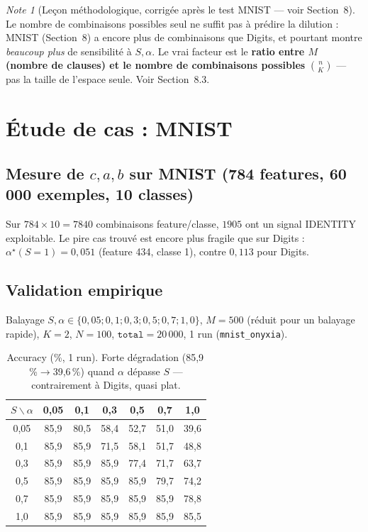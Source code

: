 \documentclass[12pt,a4paper]{article}
\theoremstyle{remark}
\newtheorem{note}{Note}[section]
\begin{document}
\begin{note}[Leçon méthodologique, corrigée après le test MNIST --- voir Section~8]
Le nombre de combinaisons possibles seul ne suffit pas à prédire la dilution :
MNIST (Section~8) a encore plus de combinaisons que Digits, et pourtant montre
\emph{beaucoup plus} de sensibilité à $S,\alpha$. Le vrai facteur est le
\textbf{ratio entre $M$ (nombre de clauses) et le nombre de combinaisons
possibles} $\binom{n}{K}$ --- pas la taille de l'espace seule. Voir Section~8.3.
\end{note}

\section{Étude de cas : MNIST}

\subsection{Mesure de $c,a,b$ sur MNIST (784 features, 60\,000 exemples, 10 classes)}

Sur $784\times10=7840$ combinaisons feature/classe, $1905$ ont un signal
IDENTITY exploitable. Le pire cas trouvé est encore plus fragile que sur
Digits : $\alpha^\star(S{=}1)=0{,}051$ (feature 434, classe 1), contre $0{,}113$
pour Digits.

\subsection{Validation empirique}

Balayage $S,\alpha\in\{0{,}05;0{,}1;0{,}3;0{,}5;0{,}7;1{,}0\}$, $M=500$
(réduit pour un balayage rapide), $K=2$, $N=100$, $\mathtt{total}=20\,000$,
1 run (\texttt{mnist\_onyxia}).

\begin{table}[h]
\centering
\renewcommand{\arraystretch}{1.2}
\begin{tabular}{ccccccc}
\toprule
$S \backslash \alpha$ & 0,05 & 0,1 & 0,3 & 0,5 & 0,7 & 1,0 \\
\midrule
0,05 & 85,9 & 80,5 & 58,4 & 52,7 & 51,0 & 39,6 \\
0,1  & 85,9 & 85,9 & 71,5 & 58,1 & 51,7 & 48,8 \\
0,3  & 85,9 & 85,9 & 85,9 & 77,4 & 71,7 & 63,7 \\
0,5  & 85,9 & 85,9 & 85,9 & 85,9 & 79,7 & 74,2 \\
0,7  & 85,9 & 85,9 & 85,9 & 85,9 & 85,9 & 78,8 \\
1,0  & 85,9 & 85,9 & 85,9 & 85,9 & 85,9 & 85,5 \\
\bottomrule
\end{tabular}
\caption{Accuracy (\%, 1 run). Forte dégradation (85,9\,\%$\to$39,6\,\%) quand
$\alpha$ dépasse $S$ --- contrairement à Digits, quasi plat.}
\end{table}
\end{document}

